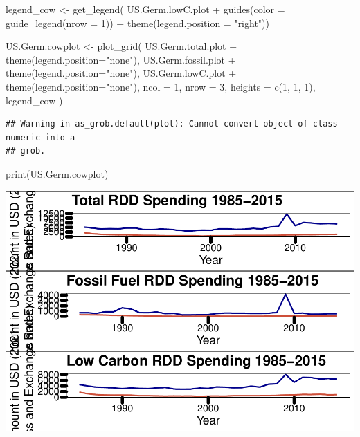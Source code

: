 \documentclass[
  12pt,
]{article}
\newenvironment{Shaded}{\begin{snugshade}}{\end{snugshade}}
\newcommand{\AttributeTok}[1]{\textcolor[rgb]{0.77,0.63,0.00}{#1}}
\newcommand{\DecValTok}[1]{\textcolor[rgb]{0.00,0.00,0.81}{#1}}
\newcommand{\FunctionTok}[1]{\textcolor[rgb]{0.00,0.00,0.00}{#1}}
\newcommand{\NormalTok}[1]{#1}
\newcommand{\OtherTok}[1]{\textcolor[rgb]{0.56,0.35,0.01}{#1}}
\newcommand{\SpecialCharTok}[1]{\textcolor[rgb]{0.00,0.00,0.00}{#1}}
\newcommand{\StringTok}[1]{\textcolor[rgb]{0.31,0.60,0.02}{#1}}
\begin{document}
\begin{Shaded}
\begin{Highlighting}[]
\NormalTok{legend\_cow }\OtherTok{\textless{}{-}} \FunctionTok{get\_legend}\NormalTok{(}
\NormalTok{  US.Germ.lowC.plot }\SpecialCharTok{+} 
  \FunctionTok{guides}\NormalTok{(}\AttributeTok{color =} \FunctionTok{guide\_legend}\NormalTok{(}\AttributeTok{nrow =} \DecValTok{1}\NormalTok{)) }\SpecialCharTok{+}
  \FunctionTok{theme}\NormalTok{(}\AttributeTok{legend.position =} \StringTok{"right"}\NormalTok{))}



\NormalTok{US.Germ.cowplot }\OtherTok{\textless{}{-}} \FunctionTok{plot\_grid}\NormalTok{(}
\NormalTok{  US.Germ.total.plot }\SpecialCharTok{+} \FunctionTok{theme}\NormalTok{(}\AttributeTok{legend.position=}\StringTok{"none"}\NormalTok{),}
\NormalTok{  US.Germ.fossil.plot }\SpecialCharTok{+} \FunctionTok{theme}\NormalTok{(}\AttributeTok{legend.position=}\StringTok{"none"}\NormalTok{),}
\NormalTok{  US.Germ.lowC.plot }\SpecialCharTok{+} \FunctionTok{theme}\NormalTok{(}\AttributeTok{legend.position=}\StringTok{"none"}\NormalTok{),}
  \AttributeTok{ncol =} \DecValTok{1}\NormalTok{,}
  \AttributeTok{nrow =} \DecValTok{3}\NormalTok{,}
  \AttributeTok{heights =} \FunctionTok{c}\NormalTok{(}\DecValTok{1}\NormalTok{, }\DecValTok{1}\NormalTok{, }\DecValTok{1}\NormalTok{),}
\NormalTok{  legend\_cow}
\NormalTok{  )}
\end{Highlighting}
\end{Shaded}

\begin{verbatim}
## Warning in as_grob.default(plot): Cannot convert object of class numeric into a
## grob.
\end{verbatim}

\begin{Shaded}
\begin{Highlighting}[]
\FunctionTok{print}\NormalTok{(US.Germ.cowplot)}
\end{Highlighting}
\end{Shaded}

\includegraphics{Chang_Jenkins_Mullens_ENV872_Final_files/figure-latex/unnamed-chunk-1-6.pdf}
\end{document}
